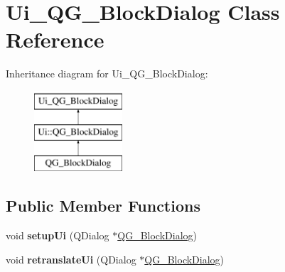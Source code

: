 \hypertarget{classUi__QG__BlockDialog}{\section{Ui\-\_\-\-Q\-G\-\_\-\-Block\-Dialog Class Reference}
\label{classUi__QG__BlockDialog}
}
Inheritance diagram for Ui\-\_\-\-Q\-G\-\_\-\-Block\-Dialog\-:\begin{figure}[H]
\begin{center}
\leavevmode
\includegraphics[height=3.000000cm]{classUi__QG__BlockDialog}
\end{center}
\end{figure}
\subsection*{Public Member Functions}
\begin{DoxyCompactItemize}
\item 
\hypertarget{classUi__QG__BlockDialog_a344e9f4ff7480f22b5f85a7d25ed2d9b}{void {\bfseries setup\-Ui} (Q\-Dialog $\ast$\hyperlink{classQG__BlockDialog}{Q\-G\-\_\-\-Block\-Dialog})}\label{classUi__QG__BlockDialog_a344e9f4ff7480f22b5f85a7d25ed2d9b}

\item 
\hypertarget{classUi__QG__BlockDialog_abb28c77eed3001ee2e828ebd3387a47c}{void {\bfseries retranslate\-Ui} (Q\-Dialog $\ast$\hyperlink{classQG__BlockDialog}{Q\-G\-\_\-\-Block\-Dialog})}\label{classUi__QG__BlockDialog_abb28c77eed3001ee2e828ebd3387a47c}

\end{DoxyCompactItemize}
